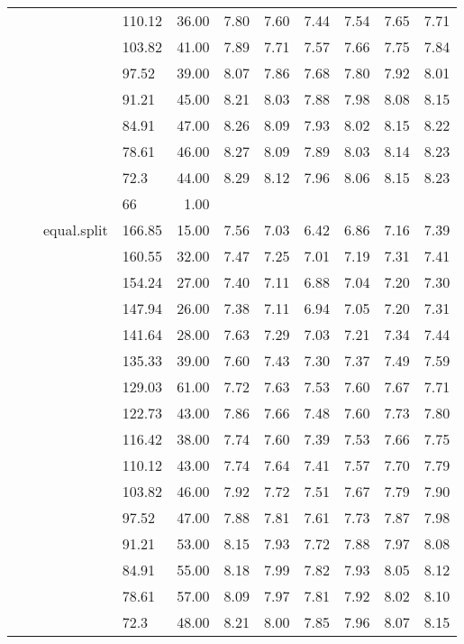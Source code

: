 \begin{longtable}{llllrrrrrrr}
   &  &  & 110.12 & 36.00 & 7.80 & 7.60 & 7.44 & 7.54 & 7.65 & 7.71 \\ 
   &  &  & 103.82 & 41.00 & 7.89 & 7.71 & 7.57 & 7.66 & 7.75 & 7.84 \\ 
   &  &  & 97.52 & 39.00 & 8.07 & 7.86 & 7.68 & 7.80 & 7.92 & 8.01 \\ 
   &  &  & 91.21 & 45.00 & 8.21 & 8.03 & 7.88 & 7.98 & 8.08 & 8.15 \\ 
   &  &  & 84.91 & 47.00 & 8.26 & 8.09 & 7.93 & 8.02 & 8.15 & 8.22 \\ 
   &  &  & 78.61 & 46.00 & 8.27 & 8.09 & 7.89 & 8.03 & 8.14 & 8.23 \\ 
   &  &  & 72.3 & 44.00 & 8.29 & 8.12 & 7.96 & 8.06 & 8.15 & 8.23 \\ 
   &  &  & 66 & 1.00 &  &  &  &  &  &  \\ 
   &  & equal.split & 166.85 & 15.00 & 7.56 & 7.03 & 6.42 & 6.86 & 7.16 & 7.39 \\ 
   &  &  & 160.55 & 32.00 & 7.47 & 7.25 & 7.01 & 7.19 & 7.31 & 7.41 \\ 
   &  &  & 154.24 & 27.00 & 7.40 & 7.11 & 6.88 & 7.04 & 7.20 & 7.30 \\ 
   &  &  & 147.94 & 26.00 & 7.38 & 7.11 & 6.94 & 7.05 & 7.20 & 7.31 \\ 
   &  &  & 141.64 & 28.00 & 7.63 & 7.29 & 7.03 & 7.21 & 7.34 & 7.44 \\ 
   &  &  & 135.33 & 39.00 & 7.60 & 7.43 & 7.30 & 7.37 & 7.49 & 7.59 \\ 
   &  &  & 129.03 & 61.00 & 7.72 & 7.63 & 7.53 & 7.60 & 7.67 & 7.71 \\ 
   &  &  & 122.73 & 43.00 & 7.86 & 7.66 & 7.48 & 7.60 & 7.73 & 7.80 \\ 
   &  &  & 116.42 & 38.00 & 7.74 & 7.60 & 7.39 & 7.53 & 7.66 & 7.75 \\ 
   &  &  & 110.12 & 43.00 & 7.74 & 7.64 & 7.41 & 7.57 & 7.70 & 7.79 \\ 
   &  &  & 103.82 & 46.00 & 7.92 & 7.72 & 7.51 & 7.67 & 7.79 & 7.90 \\ 
   &  &  & 97.52 & 47.00 & 7.88 & 7.81 & 7.61 & 7.73 & 7.87 & 7.98 \\ 
   &  &  & 91.21 & 53.00 & 8.15 & 7.93 & 7.72 & 7.88 & 7.97 & 8.08 \\ 
   &  &  & 84.91 & 55.00 & 8.18 & 7.99 & 7.82 & 7.93 & 8.05 & 8.12 \\ 
   &  &  & 78.61 & 57.00 & 8.09 & 7.97 & 7.81 & 7.92 & 8.02 & 8.10 \\ 
   &  &  & 72.3 & 48.00 & 8.21 & 8.00 & 7.85 & 7.96 & 8.07 & 8.15 \\ 

\end{longtable}
